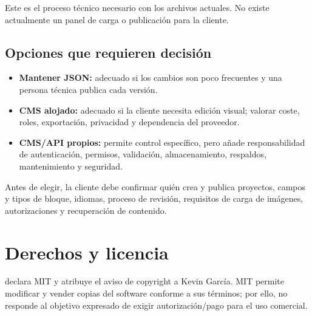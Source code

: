 \documentclass[11pt,a4paper]{report}
\begin{document}
\begin{center}
\end{center}

Este es el proceso técnico necesario con los archivos actuales. No existe actualmente un panel de carga o publicación para la cliente.

\section{Opciones que requieren decisión}

\begin{itemize}
  \item \textbf{Mantener JSON:} adecuado si los cambios son poco frecuentes y una persona técnica publica cada versión.
  \item \textbf{CMS alojado:} adecuado si la cliente necesita edición visual; valorar coste, roles, exportación, privacidad y dependencia del proveedor.
  \item \textbf{CMS/API propios:} permite control específico, pero añade responsabilidad de autenticación, permisos, validación, almacenamiento, respaldos, mantenimiento y seguridad.
\end{itemize}

Antes de elegir, la cliente debe confirmar quién crea y publica proyectos, campos y tipos de bloque, idiomas, proceso de revisión, requisitos de carga de imágenes, autorizaciones y recuperación de contenido.

\chapter{Derechos y licencia}

 declara MIT y atribuye el aviso de copyright a Kevin García. MIT permite modificar y vender copias del software conforme a sus términos; por ello, no responde al objetivo expresado de exigir autorización/pago para el uso comercial.
\end{document}
